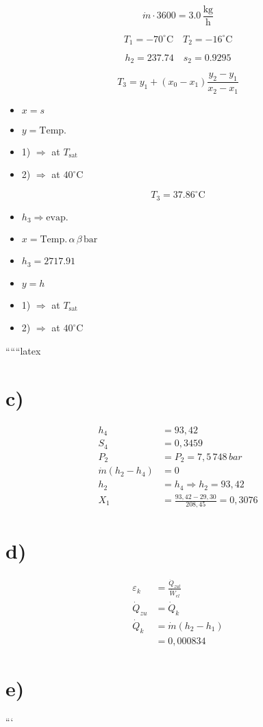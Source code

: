 \[
\dot{m} \cdot 3600 = 3.0 \, \frac{\text{kg}}{\text{h}}
\]

\[
T_1 = -70^\circ \text{C} \quad T_2 = -16^\circ \text{C}
\]

\[
h_2 = 237.74 \quad s_2 = 0.9295
\]

\[
T_3 = y_1 + \left( x_0 - x_1 \right) \frac{y_2 - y_1}{x_2 - x_1}
\]

\begin{itemize}
    \item $x = s$
    \item $y = \text{Temp.}$
    \item 1) $\Rightarrow$ at $T_{\text{sat}}$
    \item 2) $\Rightarrow$ at $40^\circ \text{C}$
\end{itemize}

\[
T_3 = 37.86^\circ \text{C}
\]

\begin{itemize}
    \item $h_3 \Rightarrow \text{evap.}$
    \item $x = \text{Temp.} \, \alpha \, \beta \, \text{bar}$
    \item $h_3 = 2717.91$
    \item $y = h$
    \item 1) $\Rightarrow$ at $T_{\text{sat}}$
    \item 2) $\Rightarrow$ at $40^\circ \text{C}$
\end{itemize}

``````latex


\section*{c)}

\begin{align*}
    h_4 &= 93,42 \\
    S_4 &= 0,3459 \\
    P_2 &= P_2 = 7,5 \, 748 \, bar \\
    \dot{m}(h_2 - h_4) &= 0 \\
    h_2 &= h_4 \Rightarrow h_2 = 93,42 \\
    X_1 &= \frac{93,42 - 29,30}{208,45} = 0,3076
\end{align*}

\section*{d)}

\begin{align*}
    \varepsilon_k &= \frac{\dot{Q}_{zul}}{\dot{W}_{el}} \\
    \dot{Q}_{zu} &= \dot{Q}_k \\
    \dot{Q}_k &= \dot{m}(h_2 - h_1) \\
    &= 0,000834
\end{align*}

\section*{e)}


```